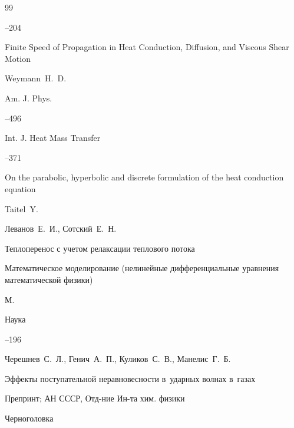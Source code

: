 \begin{thebibliography}{99}

--204







\paper Finite Speed of Propagation in Heat Conduction, Diffusion, and Viscous Shear Motion

\by Weymann~H.~D. 

\jour Am.  J.  Phys.



--496






\jour Int. J. Heat Mass Transfer




--371

\paper  On the parabolic, hyperbolic and discrete formulation of the heat conduction equation

\by Taitel~Y. 





\by Леванов~Е.~И., Сотский~Е.~Н.

\paper Теплоперенос с учетом релаксации теплового потока

\inbook Математическое моделирование (нелинейные дифференциальные уравнения математической физики)

\publaddr М.

\publ Наука


--196




\by Черешнев~С.~Л., Генич~А.~П., Куликов~С.~В., Манелис~Г.~Б.

\preprint Эффекты поступательной неравновесности в~ударных волнах в~газах

\preprintinfo Препринт; АН СССР, Отд-ние Ин-та хим. физики

\publaddr Черноголовка


\end{thebibliography}
